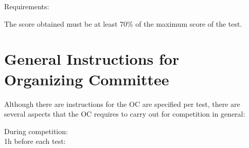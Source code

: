 \begin{enumerate}
{\bf\item Requirements:} The score obtained must be at least 70\% of the maximum score of the test.
\end{enumerate}

\section{General Instructions for Organizing Committee}\label{sec:oc_general_instructions}
Although there are instructions for the OC are specified per test, there are several aspects that the OC requires to carry out for competition in general:
\begin{description}
\item[During competition:] \hfill
{}
\item[1h before each test:] \hfill
{}
\end{description}


